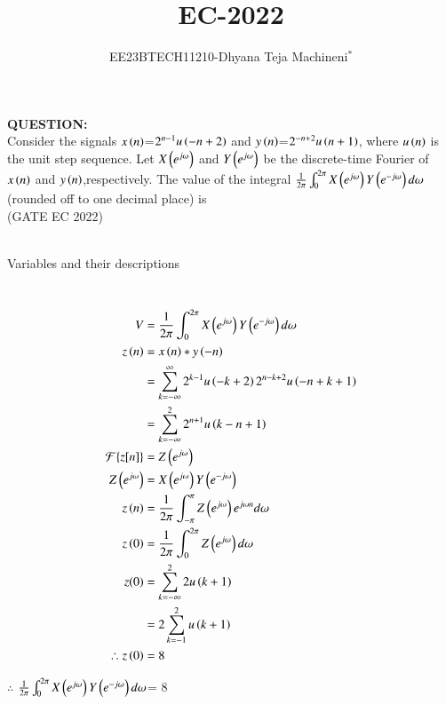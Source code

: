 \documentclass[journal,12pt,twocolumn]{IEEEtran}
\theoremstyle{remark}
\begin{document}

\vspace{3cm}
\title{\textbf{EC-2022}}
\author{EE23BTECH11210-Dhyana Teja Machineni$^{*}$%
}
\maketitle
\newpage
\bigskip

\textbf{QUESTION:}\\
Consider the signals $x\left(n\right)$=$2^{n-1} u\left( -n+2\right)$ and $y\left(n\right)$=$2^{-n+2}u\left( n+1\right)$, where $u\left(n\right)$ is the unit step sequence. Let $X\left(e^{j\omega}\right)$ and $Y\left(e^{j\omega}\right)$ be the discrete-time Fourier of $x\left(n\right)$ and $y\left(n\right)$,respectively. The value of the integral $\frac{1}{2\pi}\int_{0}^{2\pi} X\left(e^{j\omega}\right) Y\left(e^{-j\omega}\right) d \omega$
(rounded off to one decimal place) is \underline{{\hspace{1.5in}}}\\
\hfill{(GATE EC 2022)}\\

\solution\\
\begin{table}[h]
         \label{tab:table}
         
         \caption{Variables and their descriptions}
     \end{table}\\
\begin{align}
    V&=\frac{1}{2\pi}\int_{0}^{2\pi} X\left(e^{j\omega}\right) Y\left(e^{-j\omega}\right) d \omega\\
   z\left( n\right)&= x\left(n\right) * y\left(-n\right)\\
   &=\sum_{k=-\infty}^{\infty} 2^{k-1} u\left(-k+2\right) 2^{n-k+2} u\left(-n+k+1\right)\\
   &=\sum_{k=-\infty}^{2} 2^{n+1} u\left(k-n+1\right)\\
   \mathcal{F}\{z[n]\}&= Z\left(e^{j\omega}\right)\\
   Z\left(e^{j\omega}\right)&= X\left(e^{j\omega}\right) Y\left(e^{-j \omega}\right)\\
z\left(n\right)&=\frac{1}{2\pi}\int_{-\pi}^{\pi} Z\left(e^{j\omega}\right) e^{j\omega n} d\omega\\
   z\left(0\right)&=\frac{1}{2\pi}\int_{0}^{2\pi} Z\left(e^{j\omega}\right) d \omega\\
   z(0)&=\sum_{k=-\infty}^{2} 2 u\left(k+1\right)\\
   &=2\sum_{k=-1}^{2}u\left(k+1\right)\\
  \therefore z\left(0\right) &=8
\end{align}

$\therefore$ $\frac{1}{2\pi}\int_{0}^{2\pi} X\left(e^{j\omega}\right) Y\left(e^{-j\omega}\right) d \omega$= $8$
\end{document}
